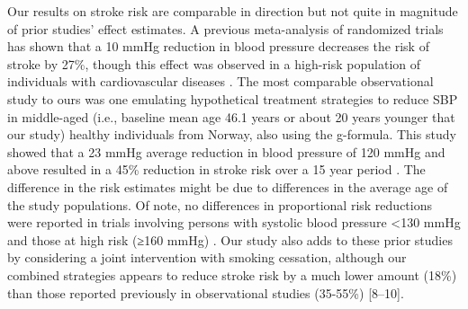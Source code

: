 \documentclass[
]{book}
\begin{document}
Our results on stroke risk are comparable in direction but not quite in magnitude of prior studies' effect estimates. A previous meta-analysis of randomized trials has shown that a 10 mmHg reduction in blood pressure decreases the risk of stroke by 27\%, though this effect was observed in a high-risk population of individuals with cardiovascular diseases \autocite{ettehad2016}. The most comparable observational study to ours was one emulating hypothetical treatment strategies to reduce SBP in middle-aged (i.e., baseline mean age 46.1 years or about 20 years younger that our study) healthy individuals from Norway, also using the g-formula. This study showed that a 23 mmHg average reduction in blood pressure of 120 mmHg and above resulted in a 45\% reduction in stroke risk over a 15 year period \autocite{vangenlonne2018}. The difference in the risk estimates might be due to differences in the average age of the study populations. Of note, no differences in proportional risk reductions were reported in trials involving persons with systolic blood pressure \textless130 mmHg and those at high risk (≥160 mmHg) \autocite{ettehad2016}. Our study also adds to these prior studies by considering a joint intervention with smoking cessation, although our combined strategies appears to reduce stroke risk by a much lower amount (18\%) than those reported previously in observational studies (35-55\%) {[}8--10{]}.
\end{document}
